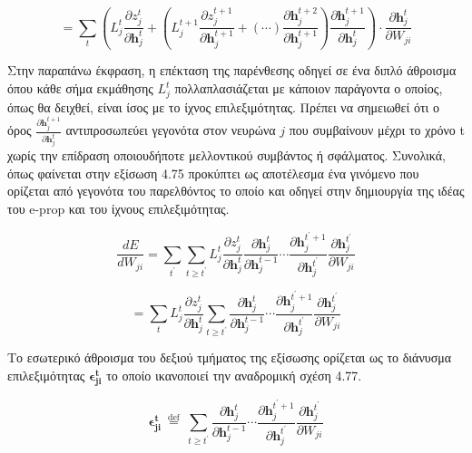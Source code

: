 \documentclass[12pt]{report}
\begin{document}
\begin{equation}
    =\sum_{t}\left(L_{j}^{t} \frac{\partial z_{j}^{t}}{\partial \mathbf{h}_{j}^{t}}+\left(L_{j}^{t+1} \frac{\partial z_{j}^{t+1}}{\partial \mathbf{h}_{j}^{t+1}}+(\cdots) \frac{\partial \mathbf{h}_{j}^{t+2}}{\partial \mathbf{h}_{j}^{t+1}}\right) \frac{\partial \mathbf{h}_{j}^{t+1}}{\partial \mathbf{h}_{j}^{t}}\right) \cdot \frac{\partial \mathbf{h}_{j}^{t}}{\partial W_{j i}}
\end{equation}

Στην παραπάνω έκφραση, η επέκταση της παρένθεσης οδηγεί σε ένα διπλό άθροισμα όπου κάθε σήμα εκμάθησης \(L_j^t\) πολλαπλασιάζεται με κάποιον παράγοντα ο οποίος, όπως θα δειχθεί, είναι ίσος με το ίχνος επιλεξιμότητας. Πρέπει να σημειωθεί ότι ο όρος \(\frac{\partial \mathbf{h}_{j}^{t+1}}{\partial \mathbf{h}_{j}^{t}}\) αντιπροσωπεύει γεγονότα στον νευρώνα \(j\) που συμβαίνουν μέχρι το χρόνο \textlatin{t} χωρίς την επίδραση οποιουδήποτε μελλοντικού συμβάντος ή σφάλματος. Συνολικά, όπως φαίνεται στην εξίσωση 4.75 προκύπτει ως αποτέλεσμα ένα γινόμενο που ορίζεται από γεγονότα του παρελθόντος το οποίο και οδηγεί στην δημιουργία της ιδέας του \textlatin{e-prop} και του ίχνους επιλεξιμότητας.

\begin{equation}
    \frac{d E}{d W_{j i}}=\sum_{t^\prime}\sum_{t\geq t^\prime}L_{j}^{t} \frac{\partial z_{j}^{t}}{\partial \mathbf{h}_{j}^{t}}\frac{\partial \mathbf{h}_{j}^{t}}{\partial \mathbf{h}_{j}^{t-1}} \cdots \frac{\partial \mathbf{h}_{j}^{t^\prime + 1}}{\partial \mathbf{h}_{j}^{t^\prime}} \frac{\partial \mathbf{h}_{j}^{t^\prime}}{\partial W_{j i}} 
\end{equation}

\begin{equation}
    =\sum_{t}L_{j}^{t} \frac{\partial z_{j}^{t}}{\partial \mathbf{h}_{j}^{t}}\sum_{t\geq t^\prime}\frac{\partial \mathbf{h}_{j}^{t}}{\partial \mathbf{h}_{j}^{t-1}} \cdots \frac{\partial \mathbf{h}_{j}^{t^\prime + 1}}{\partial \mathbf{h}_{j}^{t^\prime}} \frac{\partial \mathbf{h}_{j}^{t^\prime}}{\partial W_{j i}} 
\end{equation}

\medskip
Το εσωτερικό άθροισμα του δεξιού τμήματος της εξίσωσης ορίζεται ως το διάνυσμα επιλεξιμότητας \(\mathbf{\epsilon_{ji}^t}\) το οποίο ικανοποιεί την αναδρομική σχέση 4.77.

\begin{equation}
    \mathbf{\epsilon_{ji}^t} \stackrel{\text { def }}{=} \sum_{t\geq t^\prime}\frac{\partial \mathbf{h}_{j}^{t}}{\partial \mathbf{h}_{j}^{t-1}} \cdots \frac{\partial \mathbf{h}_{j}^{t^\prime + 1}}{\partial \mathbf{h}_{j}^{t^\prime}} \frac{\partial \mathbf{h}_{j}^{t^\prime}}{\partial W_{j i}}
\end{equation}
\end{document}
